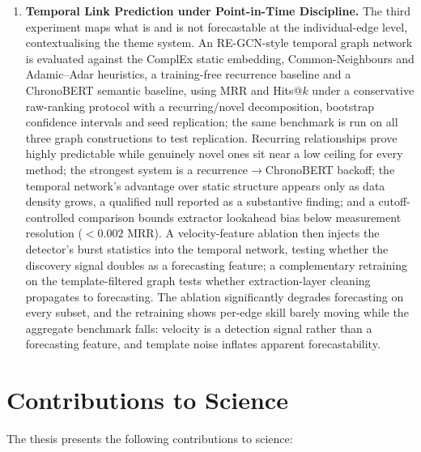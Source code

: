 \documentclass[a4paper,12pt]{report}
\begin{document}
\begin{enumerate}
\item \textbf{Temporal Link Prediction under Point-in-Time Discipline.} The
third experiment maps what is and is not forecastable at the individual-edge
level, contextualising the theme system. An RE-GCN-style temporal graph network
is evaluated against the ComplEx static embedding, Common-Neighbours
and Adamic--Adar heuristics, a training-free recurrence baseline and a
ChronoBERT semantic baseline, using MRR and Hits@$k$ under a conservative
raw-ranking protocol with a recurring/novel decomposition, bootstrap confidence
intervals and seed replication; the same benchmark is run on all three graph
constructions to test replication. Recurring relationships prove highly
predictable while genuinely novel ones sit near a low ceiling for every
method; the strongest system is a recurrence$\rightarrow$ChronoBERT
backoff; the temporal network's advantage over static structure appears
only as data density grows, a qualified null reported as a substantive
finding; and a cutoff-controlled comparison bounds extractor lookahead
bias below measurement resolution ($<0.002$ MRR). A velocity-feature
ablation then injects
the detector's burst statistics into the temporal network, testing whether
the discovery signal doubles as a forecasting feature; a complementary
retraining on the template-filtered graph tests whether extraction-layer
cleaning propagates to forecasting. The ablation significantly degrades
forecasting on every subset, and the retraining shows per-edge skill
barely moving while the aggregate benchmark falls: velocity is a
detection signal rather than a forecasting feature, and template noise
inflates apparent forecastability.
\end{enumerate}

\section{Contributions to Science}
\label{sec:contributions}
The thesis presents the following contributions to science:
\end{document}
